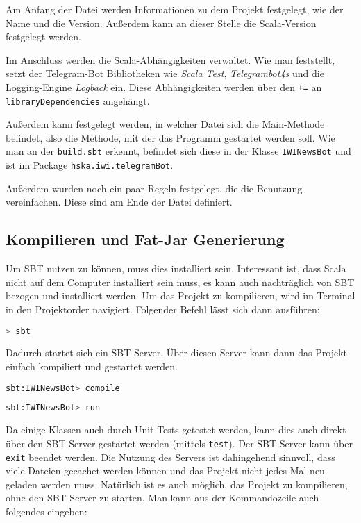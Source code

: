 Am Anfang der Datei werden Informationen zu dem Projekt festgelegt, wie der Name und die Version. Außerdem kann an dieser Stelle die Scala-Version festgelegt werden.

Im Anschluss werden die Scala-Abhängigkeiten verwaltet. Wie man feststellt, setzt der Telegram-Bot Bibliotheken wie \emph{Scala Test}, \emph{Telegrambot4s} und die Logging-Engine \emph{Logback} ein. Diese Abhängigkeiten werden über den \texttt{+=} an \texttt{libraryDependencies} angehängt.

Außerdem kann festgelegt werden, in welcher Datei sich die Main-Methode befindet, also die Methode, mit der das Programm gestartet werden soll. Wie man an der \texttt{build.sbt} erkennt, befindet sich diese in der Klasse \texttt{IWINewsBot} und ist im Package \texttt{hska\allowbreak.iwi\allowbreak.telegramBot}.

Außerdem wurden noch ein paar Regeln festgelegt, die die Benutzung vereinfachen. Diese sind am Ende der Datei definiert.

\subsection{Kompilieren und Fat-Jar Generierung}
Um SBT nutzen zu können, muss dies installiert sein. Interessant ist, dass Scala nicht auf dem Computer installiert sein muss, es kann auch nachträglich von SBT bezogen und installiert werden. Um das Projekt zu kompilieren, wird im Terminal in den Projektorder navigiert. Folgender Befehl lässt sich dann ausführen:

\begin{lstlisting}[language=bash]
> sbt
\end{lstlisting}

Dadurch startet sich ein SBT-Server. Über diesen Server kann dann das Projekt einfach kompiliert und gestartet werden.

\begin{lstlisting}[language=bash]
sbt:IWINewsBot> compile
\end{lstlisting}

\begin{lstlisting}[language=bash]
sbt:IWINewsBot> run
\end{lstlisting}

Da einige Klassen auch durch Unit-Tests getestet werden, kann dies auch direkt über den SBT-Server gestartet werden (mittels \texttt{test}). Der SBT-Server kann über \texttt{exit} beendet werden. Die Nutzung des Servers ist dahingehend sinnvoll, dass viele Dateien gecachet werden können und das Projekt nicht jedes Mal neu geladen werden muss. Natürlich ist es auch möglich, das Projekt zu kompilieren, ohne den SBT-Server zu starten. Man kann aus der Kommandozeile auch folgendes eingeben:

